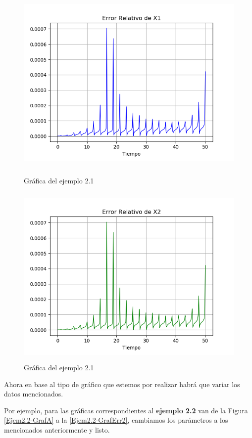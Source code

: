\begin{figure}[h!]
	\begin{center}
        \includegraphics[height=9cm]{Ejem2_1-GrafErr1}
        \caption{Gráfica del ejemplo 2.1}

        \includegraphics[height=9cm]{Ejem2_1-GrafErr2}
        \caption{Gráfica del ejemplo 2.1}
    \end{center}
\end{figure}

Ahora en base al tipo de gráfico que estemos por realizar habrá que variar los datos mencionados.

\bigskip

Por ejemplo, para las gráficas correspondientes al \textbf{ejemplo 2.2} van de la Figura \ref{Ejem2.2-GrafA} a la \ref{Ejem2.2-GrafErr2}, cambiamos los parámetros a los mencionados anteriormente y listo.


